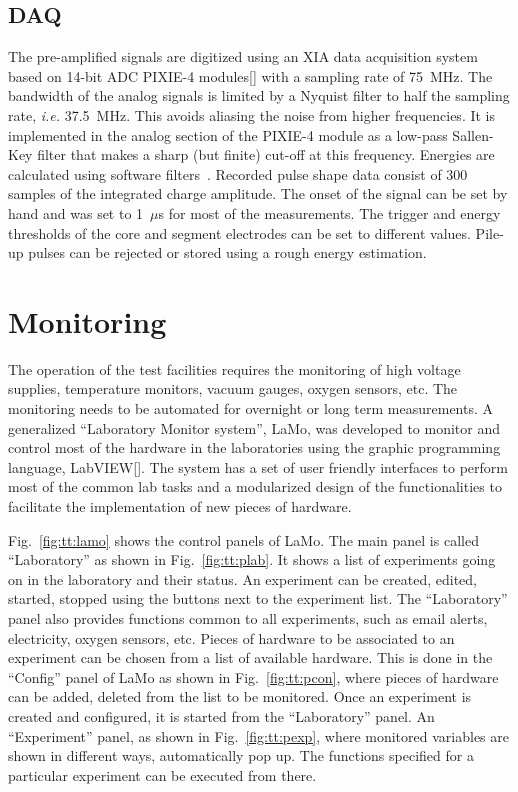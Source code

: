 \subsection{DAQ} 
\label{sec:tt:daq}
The pre-amplified signals are digitized using an XIA data acquisition system based on 14-bit ADC PIXIE-4 modules[] with a sampling rate of 75~MHz. The bandwidth of the analog signals is limited by a Nyquist filter to half the sampling rate, \textit{i.e.} 37.5~MHz. This avoids aliasing the noise from higher frequencies. It is implemented in the analog section of the PIXIE-4 module as a low-pass Sallen-Key filter that makes a sharp (but finite) cut-off at this frequency. Energies are calculated using software filters~\cite{Pixie4}. Recorded pulse shape data consist of 300 samples of the integrated charge amplitude. The onset of the signal can be set by hand and was set to 1~$\mu$s for most of the measurements. The trigger and energy thresholds of the core and segment electrodes can be set to different values. Pile-up pulses can be rejected or stored using a rough energy estimation.


\section{Monitoring} 
\label{sec:tt:lamo}
The operation of the test facilities requires the monitoring of high voltage supplies, temperature monitors, vacuum gauges, oxygen sensors, etc. The monitoring needs to be automated for overnight or long term measurements. A generalized ``Laboratory Monitor system'', LaMo, was developed to monitor and control most of the hardware in the laboratories using the graphic programming language, LabVIEW[]. The system has a set of user friendly interfaces to perform most of the common lab tasks and a modularized design of the functionalities to facilitate the implementation of new pieces of hardware.

Fig.~\ref{fig:tt:lamo} shows the control panels of LaMo. The main panel is called ``Laboratory'' as shown in Fig.~\ref{fig:tt:plab}. It shows a list of experiments going on in the laboratory and their status. An experiment can be created, edited, started, stopped using the buttons next to the experiment list. The ``Laboratory'' panel also provides functions common to all experiments, such as email alerts, electricity, oxygen sensors, etc. Pieces of hardware to be associated to an experiment can be chosen from a list of available hardware. This is done in the ``Config'' panel of LaMo as shown in Fig.~\ref{fig:tt:pcon}, where pieces of hardware can be added, deleted from the list to be monitored. Once an experiment is created and configured, it is started from the ``Laboratory'' panel. An ``Experiment'' panel, as shown in Fig.~\ref{fig:tt:pexp}, where monitored variables are shown in different ways, automatically pop up. The functions specified for a particular experiment can be executed from there.

